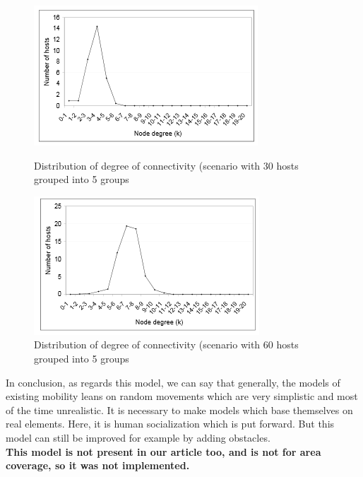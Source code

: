 \begin{figure}[h!]
    \begin{minipage}[b]{0.4\linewidth}
        \centering \includegraphics[scale=1]{../images/degreeConnectivitySocialNetwork30Nodes.png}
        \caption{Distribution of degree of connectivity (scenario with 30 hosts grouped into 5 groups\cite{networkTheory5}}
    \end{minipage}\hfill
    \begin{minipage}[b]{0.48\linewidth}
        \centering \includegraphics[scale=1]{../images/degreeConnectivitySocialNetwork60Nodes.png}
        \caption{Distribution of degree of connectivity (scenario with 60 hosts grouped into 5 groups\cite{networkTheory5}}
    \end{minipage}
\end{figure}

In conclusion, as regards this model, we can say that generally, the models of existing mobility leans on random movements which are very simplistic and most of the time unrealistic. It is necessary to make models which base themselves on real elements. Here, it is human socialization which is put forward. But this model can still be improved for example by adding obstacles.\\

\textbf{This model is not present in our article too, and is not for area coverage, so it was not implemented.}

